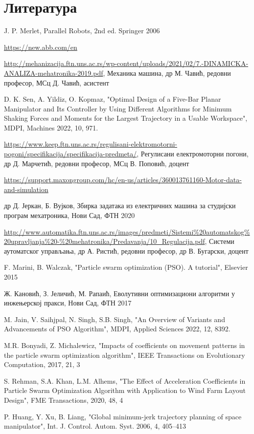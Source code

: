 \documentclass[12pt]{article}
\begin{document}
\section{Литература}
\begin{enumerate}[start=1,label={[\arabic*]}]
\item J. P. Merlet, Parallel Robots, 2nd ed. Springer 2006
\item \url{https://new.abb.com/en}
\item \url{http://mehanizacija.ftn.uns.ac.rs/wp-content/uploads/2021/02/7.-DINAMICKA-ANALIZA-mehatronika-2019.pdf}, Механика машина, др М. Чавић, редовни професор, МСц Д. Чавић, асистент
\item D. K. Sen, A. Yildiz, O. Kopmaz, "Optimal Design of a Five-Bar Planar Manipulator and Its
Controller by Using Different Algorithms for Minimum
Shaking Forces and Moments for the Largest Trajectory in a
Usable Workspace", MDPI, Machines 2022, 10, 971.
\item \url{https://www.keep.ftn.uns.ac.rs/regulisani-elektromotorni-pogoni/specifikacija/specifikacija-predmeta/}, Регулисани електромоторни погони, др Д. Марчетић, редовни професор, МСц В. Поповић, доцент
\item \url{https://support.maxongroup.com/hc/en-us/articles/360013761160-Motor-data-and-simulation}
\item др Д. Јеркан, Б. Вујков, Збирка задатака из електричних машина за студијски програм мехатроника, Нови Сад, ФТН 2020
\item \url{http://www.automatika.ftn.uns.ac.rs/images/predmeti/Sistemi%20automatskog%20upravljanja%20-%20mehatronika/Predavanja/10_Regulacija.pdf}, Системи аутоматског управљања,
др А. Ристић, редовни професор, др В. Бугарски, доцент
\item F. Marini, B. Walczak, "Particle swarm optimization (PSO). A tutorial", Elsevier 2015
\item Ж. Кановић, З. Јеличић, М. Рапаић, Еволутивни оптимизациони алгоритми у инжењерској пракси, Нови Сад, ФТН 2017
\item M. Jain, V. Saihjpal, N. Singh, S.B. Singh, "An Overview of Variants and Advancements of PSO Algorithm", MDPI, Applied Sciences 2022, 12, 8392.
\item M.R. Bonyadi, Z. Michalewicz, "Impacts of coefficients on movement patterns in the particle swarm optimization algorithm", IEEE Transactions on Evolutionary Computation, 2017, 21, 3
\item S. Rehman, S.A. Khan, L.M. Alhems, "The Effect of Acceleration Coefficients in Particle Swarm Optimization Algorithm with Application to Wind Farm Layout Design", FME Transactions, 2020, 48, 4
\item P. Huang, Y. Xu, B. Liang, "Global minimum-jerk trajectory planning of space manipulator", Int. J. Control. Autom. Syst. 2006, 4, 405–413
\end{enumerate}
\end{document}
